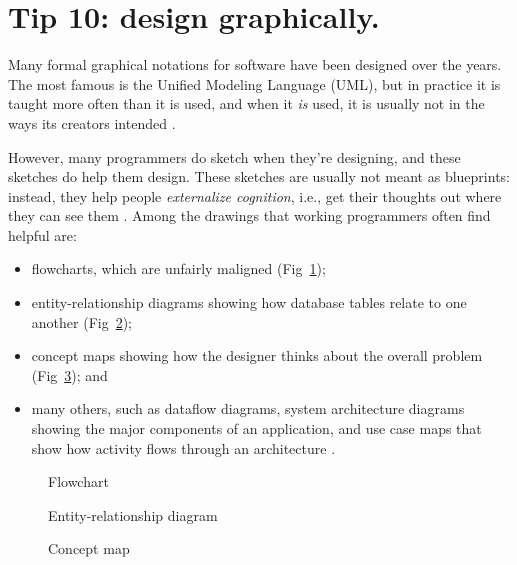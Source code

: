 \documentclass[10pt,letterpaper]{article}
\begin{document}
\section*{Tip 10: design graphically.}

Many formal graphical notations for software have been designed over the years.
The most famous is the Unified Modeling Language (UML),
but in practice it is taught more often than it is used,
and when it \emph{is} used,
it is usually not in the ways its creators intended \cite{Petre2013}.

However,
many programmers do sketch when they're designing,
and these sketches do help them design.
These sketches are usually not meant as blueprints:
instead,
they help people \emph{externalize cognition},
i.e.,
get their thoughts out where they can see them \cite{Cherubini2007,Petre2016}.
Among the drawings that working programmers often find helpful are:

\begin{itemize}
\item
  flowcharts, which are unfairly maligned \cite{Scanlan1989}
  (\colorbox{green!30}{Fig~\ref{flowchart}});
\item
  entity-relationship diagrams showing how database tables relate to one another
  (\colorbox{green!30}{Fig~\ref{er-diagram}});
\item
  concept maps showing how the designer thinks about the overall problem
  (\colorbox{green!30}{Fig~\ref{concept-map}}); and
\item
  many others,
  such as dataflow diagrams,
  system architecture diagrams showing the major components of an application,
  and use case maps that show how activity flows through an architecture \cite{Reekie2006}.
\end{itemize}

\begin{figure}
  \centering
  \caption{Flowchart}
  \label{flowchart}
\end{figure}

\begin{figure}
  \centering
  \caption{Entity-relationship diagram}
  \label{er-diagram}
\end{figure}

\begin{figure}
  \centering
  \caption{Concept map}
  \label{concept-map}
\end{figure}
\end{document}
